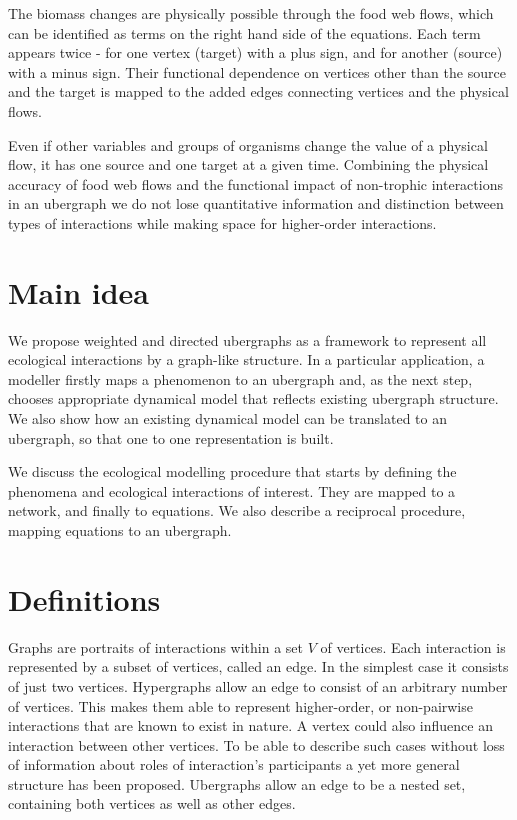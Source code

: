 \documentclass[a4paper,12pt]{article}
\theoremstyle{definition}
\theoremstyle{remark}
\begin{document}
The biomass changes are physically possible through the food web flows, which can be identified as terms on the right hand side of the equations. Each term appears twice - for one vertex (target) with a plus sign, and for another (source) with a minus sign. Their functional dependence on vertices other than the source and the target is mapped to the added edges connecting vertices and the physical flows.

Even if other variables and groups of organisms change the value of a physical flow, it has one source and one target at a given time. Combining the physical accuracy of food web flows and the functional impact of non-trophic interactions in an ubergraph we do not lose quantitative information and distinction between types of interactions while making space for higher-order interactions. %

\section{Main idea}

We propose weighted and directed ubergraphs as a framework to represent all ecological interactions by a graph-like structure. In a particular application, a modeller firstly maps a phenomenon to an ubergraph and, as the next step, chooses appropriate dynamical model that reflects existing ubergraph structure. We also show how an existing dynamical model can be translated to an ubergraph, so that one to one representation is built.

We discuss the ecological modelling procedure that starts by defining the phenomena and ecological interactions of interest. They are mapped to a network, and finally to equations. We also describe a reciprocal procedure, mapping equations to an ubergraph.

\section{Definitions}
Graphs are portraits of interactions within a set $V$ of vertices. Each interaction is represented by a subset of vertices, called an edge. In the simplest case it consists of just two vertices. Hypergraphs allow an edge to consist of an arbitrary number of vertices. This makes them able to represent higher-order, or non-pairwise interactions that are known to exist in nature. A vertex could also influence an interaction between other vertices. To be able to describe such cases without loss of information about roles of interaction's participants a yet more general structure has been proposed. Ubergraphs allow an edge to be a nested set, containing both vertices as well as other edges.
\end{document}
